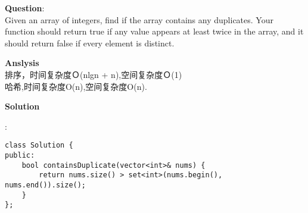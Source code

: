     
\begin{description}
    \item{\textbf{Question}}:\\%
		Given an array of integers, find if the array contains any duplicates. Your function should return true if any value appears at least twice in the array, and it should return false if every element is distinct.\\

    \item{\textbf{Anslysis}}\\
		排序，时间复杂度Ｏ(nlgn + n),空间复杂度Ｏ(1)\\
		哈希,时间复杂度O(n),空间复杂度O(n).\\

    \item{\textbf{Solution}}\\
	\item{} : \\
		\begin{lstlisting}
class Solution {
public:
    bool containsDuplicate(vector<int>& nums) {
        return nums.size() > set<int>(nums.begin(), nums.end()).size();        
    }
};		\end{lstlisting}

\end{description}

